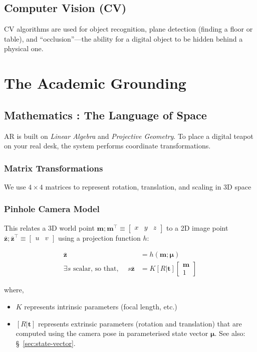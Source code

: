 \documentclass[11pt]{article}
\begin{document}
\subsection{Computer Vision (CV)}
\label{sec:org4dadbb7}
CV algorithms are used for object recognition, plane
detection (finding a floor or table), and
``occlusion''---the ability for a digital object to be
hidden behind a physical one.
\section{The Academic Grounding}
\label{sec:orgcdd5b0b}

\subsection{Mathematics : The Language of Space}
\label{sec:orge10ded4}
AR is built on \emph{Linear Algebra} and \emph{Projective
Geometry}. To place a digital teapot on your real desk,
the system performs coordinate transformations.
\subsubsection{Matrix Transformations}
\label{sec:orgacc8812}
We use \(4 \times 4\) matrices to represent rotation,
translation, and scaling in 3D space
\subsubsection{Pinhole Camera Model}
\label{sec:pin-hole-camera-model}
This relates a 3D world point \(\mathbf{m};
\mathbf{m}^{\top} \equiv \begin{bmatrix} x & y & z
\end{bmatrix}\) to a 2D image point
\(\overline{\mathbf{z}};
\overline{\mathbf{z}}^{\top}\equiv \begin{bmatrix} u &
v \end{bmatrix}\) using a projection function \(h\):

\begin{align*}
  \overline{\mathbf{z}}
  &= h(\mathbf{m}; \boldsymbol{\mu}) \\
  \exists s \text{ scalar, so that, }\quad
  s \overline{\mathbf{z}}
  &= K [R | \mathbf{t}] \begin{bmatrix}
    \mathbf{m} \\ 1
  \end{bmatrix}
\end{align*}

where,
\begin{itemize}
\item \(K\) represents intrinsic parameters (focal length,
etc.)
\item \([R | \mathbf{t}]\) represents extrinsic parameters
(rotation and translation) that are computed using
the camera pose in parameterised state vector
\(\boldsymbol{\mu}\).  See also:
\S~\ref{sec:state-vector}.
\end{itemize}
\end{document}
